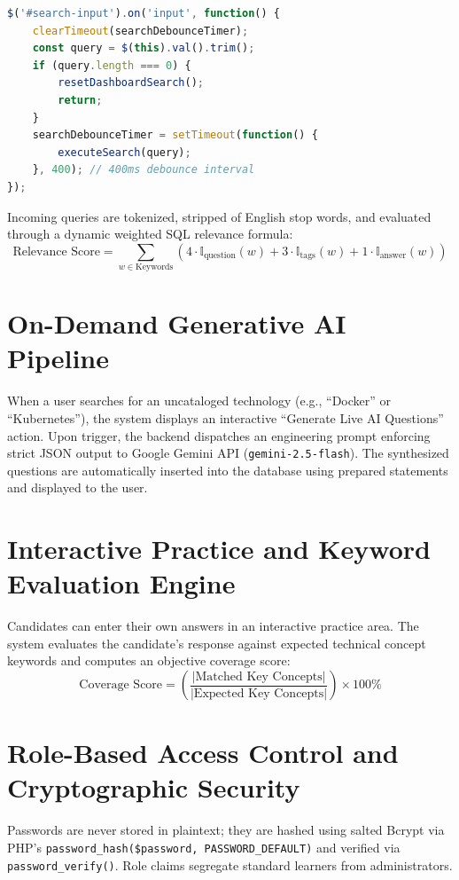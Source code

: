 \documentclass[12pt,a4paper]{report}
\begin{document}
\begin{lstlisting}[language=JavaScript, caption={Client-Side Search Debouncing Implementation}]
$('#search-input').on('input', function() {
    clearTimeout(searchDebounceTimer);
    const query = $(this).val().trim();
    if (query.length === 0) {
        resetDashboardSearch();
        return;
    }
    searchDebounceTimer = setTimeout(function() {
        executeSearch(query);
    }, 400); // 400ms debounce interval
});
\end{lstlisting}

Incoming queries are tokenized, stripped of English stop words, and evaluated through a dynamic weighted SQL relevance formula:
\begin{equation}
\text{Relevance Score} = \sum_{w \in \text{Keywords}} \left( 4 \cdot \mathbb{I}_{\text{question}}(w) + 3 \cdot \mathbb{I}_{\text{tags}}(w) + 1 \cdot \mathbb{I}_{\text{answer}}(w) \right)
\label{eq:scoring}
\end{equation}

\section{On-Demand Generative AI Pipeline}
When a user searches for an uncataloged technology (e.g., ``Docker'' or ``Kubernetes''), the system displays an interactive ``Generate Live AI Questions'' action. Upon trigger, the backend dispatches an engineering prompt enforcing strict JSON output to Google Gemini API (\texttt{gemini-2.5-flash}). The synthesized questions are automatically inserted into the database using prepared statements and displayed to the user.

\section{Interactive Practice and Keyword Evaluation Engine}
Candidates can enter their own answers in an interactive practice area. The system evaluates the candidate's response against expected technical concept keywords and computes an objective coverage score:
\begin{equation}
\text{Coverage Score} = \left( \frac{|\text{Matched Key Concepts}|}{|\text{Expected Key Concepts}|} \right) \times 100\%
\end{equation}

\section{Role-Based Access Control and Cryptographic Security}
Passwords are never stored in plaintext; they are hashed using salted Bcrypt via PHP's \texttt{password\_hash(\$password, PASSWORD\_DEFAULT)} and verified via \texttt{password\_verify()}. Role claims segregate standard learners from administrators.
\end{document}
